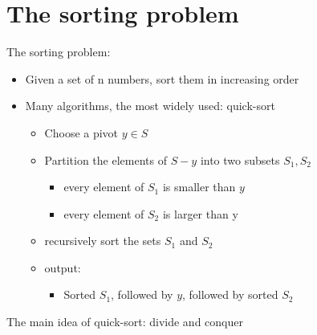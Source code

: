 \documentclass{article}[18pt]
\begin{document}
\section{The sorting problem}
The sorting problem:
\begin{itemize}
	\item Given a set of n numbers, sort them in increasing order
	\item Many algorithms, the most widely used: quick-sort
	\begin{itemize}
		\item Choose a pivot $y\in S$
		\item Partition the elements of $S-y$ into two subsets $S_1,S_2$
		\begin{itemize}
			\item every element of $S_1$ is smaller than $y$
			\item every element of $S_2$ is larger than y
		\end{itemize}
		\item recursively sort the sets $S_1$ and $S_2$
		\item output:
		\begin{itemize}
			\item Sorted $S_1$, followed by $y$, followed by sorted $S_2$
		\end{itemize}
	\end{itemize}
\end{itemize}
The main idea of quick-sort: divide and conquer
\end{document}
